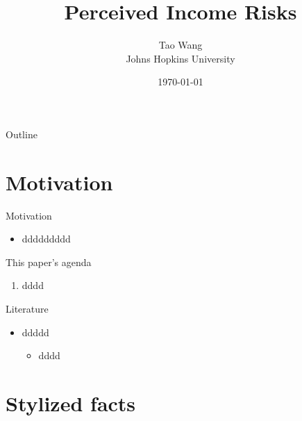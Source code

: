 \documentclass{beamer}
\title{Perceived Income Risks}
\author{Tao Wang \\ Johns Hopkins University}
\date{\today}
\begin{document}
	

\begin{frame}
	\titlepage
\end{frame}
\begin{frame}{Outline}
	\tableofcontents
\end{frame}


\section{Motivation}

\begin{frame}{Motivation}
	\begin{itemize}
		\item ddddddddd
	\end{itemize}
\end{frame}


\begin{frame}{This paper's agenda}
	\begin{enumerate}
		\item dddd
	\end{enumerate}
\end{frame}


\begin{frame}{Literature}
\begin{itemize}
	\item ddddd
	\begin{itemize}
		\item dddd
	\end{itemize}
\end{itemize}
\end{frame}

\section{Stylized facts}
\end{document}
